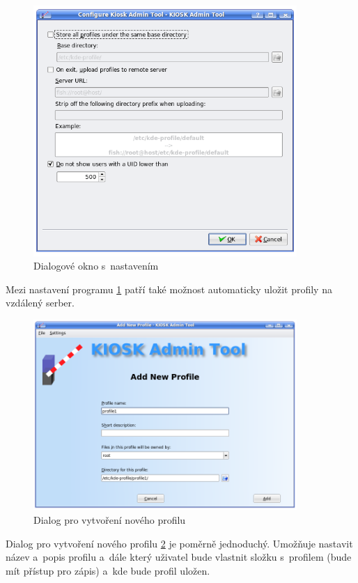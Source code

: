\begin{figure}[h]
    \centering
    \includegraphics[width=10cm]{obrazky/KioskToolKDE3/nastaveni.png}
    \caption{Dialogové okno s~nastavením}
    \label{fig:kt3_nastaveni}
\end{figure}
Mezi nastavení programu \ref{fig:kt3_nastaveni} patří také možnost automaticky uložit profily na vzdálený serber.

\begin{figure}[h]
    \centering
    \includegraphics[width=10cm]{obrazky/KioskToolKDE3/novy_profil.png}
    \caption{Dialog pro vytvoření nového profilu}
    \label{fig:kt3_novyprofil}
\end{figure}
Dialog pro vytvoření nového profilu \ref{fig:kt3_novyprofil} je poměrně jednoduchý. Umožňuje nastavit název a~popis profilu a~dále který uživatel bude vlastnit složku s~profilem (bude mít přístup pro zápis) a~kde bude profil uložen.

